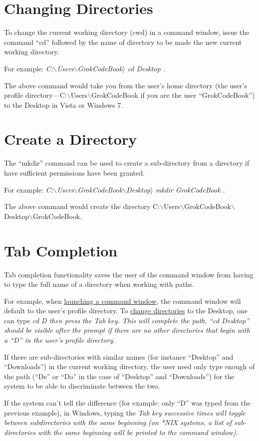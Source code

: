\section{Changing Directories}\label{change-directories}
To change the current working directory (cwd) in a command window, issue the command ``cd'' followed by the name of directory to be made the new current working directory.

For example: \em C:$\backslash$Users$\backslash$GrokCodeBook$\rangle$ cd Desktop \em.

The above command would take you from the user's home directory (the user's profile directory---C:$\backslash$Users$\backslash$GrokCodeBook if you are the user ``GrokCodeBook'') to the Desktop in Vista or Windows 7.

\section{Create a Directory}\label{create-directory}
The ``mkdir'' command can be used to create a sub-directory from a directory if have sufficient permissions have been granted.

For example: \em C:$\backslash$Users$\backslash$GrokCodeBook$\backslash$Desktop$\rangle$ mkdir GrokCodeBook \em.

The above command would create the directory C:$\backslash$Users$\backslash$GrokCodeBook$\backslash$Desktop$\backslash$GrokCodeBook.

\section{Tab Completion}\label{tab-completion}
Tab completion functionality saves the user of the command window from having to type the full name of a directory when working with paths.

For example, when \hyperref[launch-command-window]{launching a command window}, the command window will default to the user's profile directory. To \hyperref[change-directories]{change directories} to the Desktop, one can type \em cd D \em then press the \em Tab \em key. This will complete the path. ``cd Desktop'' should be visible after the prompt if there are no other directories that begin with a ``D'' in the user's profile directory. 

If there are sub-directories with similar names (for instance ``Desktop'' and ``Downloads'') in the current working directory, the user need only type enough of the path (``De'' or ``Do'' in the case of ``Desktop'' and ``Downloads'') for the system to be able to discriminate between the two. 

If the system can't tell the difference (for example: only ``D'' was typed from the previous example), in Windows, typing the \em Tab \em key successive times will toggle between subdirectories with the same beginning (on *NIX systems, a list of sub-directories with the same beginning will be printed to the command window).